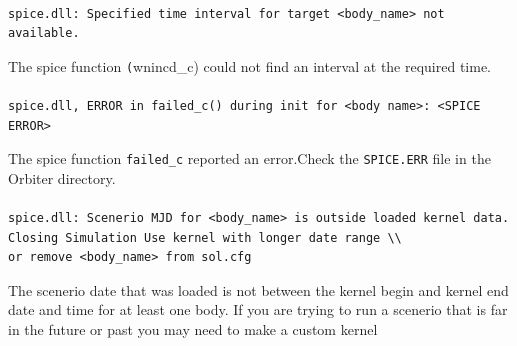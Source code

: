 \documentclass[Orbiter Technical Reference.tex]{subfiles}
\begin{document}
\paragraph{}
\begin{verbatim}
spice.dll: Specified time interval for target <body_name> not available.
\end{verbatim}
The spice function \texttt(wnincd\_c) could not find an interval at the required time.

\paragraph{}
\begin{verbatim}
spice.dll, ERROR in failed_c() during init for <body name>: <SPICE ERROR>
\end{verbatim}
The spice function \texttt{failed\_c} reported an error.Check the \texttt{SPICE.ERR} file in the Orbiter directory.

\paragraph{}
\begin{verbatim}
spice.dll: Scenerio MJD for <body_name> is outside loaded kernel data.
Closing Simulation Use kernel with longer date range \\
or remove <body_name> from sol.cfg
\end{verbatim}
The scenerio date that was loaded is not between the kernel begin and kernel end date and time for at least one body.
If you are trying to run a scenerio that is far in the future or past you may need to make a custom kernel 
\end{document}
